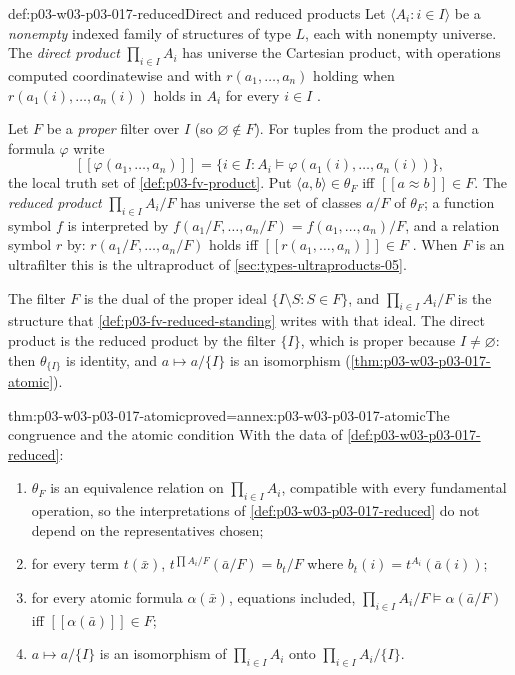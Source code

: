 \begin{hbdefinition}{def:p03-w03-p03-017-reduced}{Direct and reduced products}
Let \(\langle A_i:i\in I\rangle\) be a \emph{nonempty} indexed family of
structures of type \(L\), each with nonempty universe.  The \emph{direct
product} \(\prod_{i\in I}A_i\) has universe the Cartesian product, with
operations computed coordinatewise and with \(r(a_1,\ldots,a_n)\) holding
when \(r(a_1(i),\ldots,a_n(i))\) holds in \(A_i\) for every \(i\in I\)
\cite[V\S1, p.~204]{BurrisSankappanavar2012}.

Let \(F\) be a \emph{proper} filter over \(I\) (so \(\varnothing\notin F\)).
For tuples from the product and a formula \(\varphi\) write
\[
  [\![\varphi(a_1,\ldots,a_n)]\!]
  =\{i\in I: A_i\models\varphi(a_1(i),\ldots,a_n(i))\},
\]
the local truth set of \cref{def:p03-fv-product}.  Put
\(\langle a,b\rangle\in\theta_F\) iff \([\![a\approx b]\!]\in F\).  The
\emph{reduced product} \(\prod_{i\in I}A_i/F\) has universe the set of
classes \(a/F\) of \(\theta_F\); a function symbol \(f\) is interpreted by
\(f(a_1/F,\ldots,a_n/F)=f(a_1,\ldots,a_n)/F\), and a relation symbol \(r\)
by: \(r(a_1/F,\ldots,a_n/F)\) holds iff
\([\![r(a_1,\ldots,a_n)]\!]\in F\)
\cite[V\S2, Definitions~2.1 and~2.3, pp.~205--206]{BurrisSankappanavar2012}.
When \(F\) is an ultrafilter this is the ultraproduct of
\cref{sec:types-ultraproducts-05}.
\end{hbdefinition}

The filter \(F\) is the dual of the proper ideal \(\{I\setminus S:S\in F\}\),
and \(\prod_{i\in I}A_i/F\) is the structure that
\cref{def:p03-fv-reduced-standing} writes with that ideal.  The direct
product is the reduced product by the filter \(\{I\}\), which is proper
because \(I\neq\varnothing\): then \(\theta_{\{I\}}\) is identity, and
\(a\mapsto a/\{I\}\) is an isomorphism
(\cref{thm:p03-w03-p03-017-atomic}).

\begin{hblemma}{thm:p03-w03-p03-017-atomic}{proved=annex:p03-w03-p03-017-atomic}{The congruence and the atomic condition}
With the data of \cref{def:p03-w03-p03-017-reduced}:
\begin{enumerate}
  \item \(\theta_F\) is an equivalence relation on \(\prod_{i\in I}A_i\),
        compatible with every fundamental operation, so the interpretations
        of \cref{def:p03-w03-p03-017-reduced} do not depend on the
        representatives chosen;
  \item for every term \(t(\bar x)\),
        \(t^{\prod A_i/F}(\bar a/F)=b_t/F\) where
        \(b_t(i)=t^{A_i}(\bar a(i))\);
  \item for every atomic formula \(\alpha(\bar x)\), equations included,
        \(\prod_{i\in I}A_i/F\models\alpha(\bar a/F)\) iff
        \([\![\alpha(\bar a)]\!]\in F\);
  \item \(a\mapsto a/\{I\}\) is an isomorphism of \(\prod_{i\in I}A_i\) onto
        \(\prod_{i\in I}A_i/\{I\}\).
\end{enumerate}
\end{hblemma}

